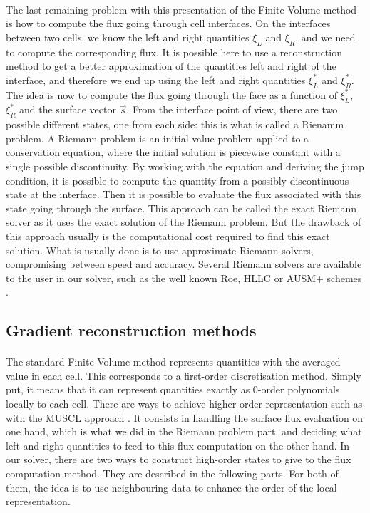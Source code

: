       \paragraph{}
      The last remaining problem with this presentation of the Finite Volume method is how to compute the flux going through cell interfaces.
      On the interfaces between two cells, we know the left and right quantities $\xi_L$ and $\xi_R$, and we need to compute the corresponding flux.
      It is possible here to use a reconstruction method to get a better approximation of the quantities left and right of the interface, and therefore we end up using the left and right quantities $\xi_L^*$ and $\xi_R^*$.
      The idea is now to compute the flux going through the face as a function of $\xi_L^*$, $\xi_R^*$ and the surface vector $\vec{s}$.
      From the interface point of view, there are two possible different states, one from each side: this is what is called a Rienamm problem.
      A Riemann problem is an initial value problem applied to a conservation equation, where the initial solution is piecewise constant with a single possible discontinuity.
      By working with the equation and deriving the jump condition, it is possible to compute the quantity from a possibly discontinuous state at the interface.
      Then it is possible to evaluate the flux associated with this state going through the surface.
      This approach can be called the exact Riemann solver as it uses the exact solution of the Riemann problem.
      But the drawback of this approach usually is the computational cost required to find this exact solution.
      What is usually done is to use approximate Riemann solvers, compromising between speed and accuracy.
      Several Riemann solvers are available to the user in our solver, such as the well known Roe, HLLC or AUSM+ schemes \cite{Roe1981, Toro2009}.


    \subsection{Gradient reconstruction methods}

      \paragraph{}
      The standard Finite Volume method represents quantities with the averaged value in each cell.
      This corresponds to a first-order discretisation method.
      Simply put, it means that it can represent quantities exactly as 0-order polynomials locally to each cell.
      There are ways to achieve higher-order representation such as with the MUSCL approach \cite{VanLeer1979}.
      It consists in handling the surface flux evaluation on one hand, which is what we did in the Riemann problem part, and deciding what left and right quantities to feed to this flux computation on the other hand.
      In our solver, there are two ways to construct high-order states to give to the flux computation method.
      They are described in the following parts.
      For both of them, the idea is to use neighbouring data to enhance the order of the local representation.



